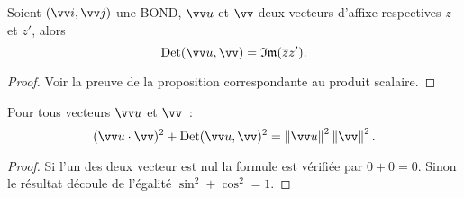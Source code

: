 \begin{prop}
  Soient $(\vi,\vj)$ une BOND, $\vu$ et $\vv$ deux vecteurs d'affixe respectives $z$ et $z'$, alors 
\begin{equation}
  \Det(\vu,\vv)=\Im(\bar{z}z').
\end{equation}
\end{prop}
\begin{proof}
  Voir la preuve de la proposition correspondante au produit scalaire.
\end{proof}
\begin{prop}
  Pour tous vecteurs $\vu$ et $\vv$~:
  \begin{equation}
    (\vu \cdot \vv)^2+\Det(\vu,\vv)^2=\norme{\vu}^2 \norme{\vv}^2.
  \end{equation}
\end{prop}
\begin{proof}
  Si l'un des deux vecteur est nul la formule est vérifiée par $0+0=0$. Sinon le résultat découle de l'égalité $\sin^2+\cos^2=1$.
\end{proof}

